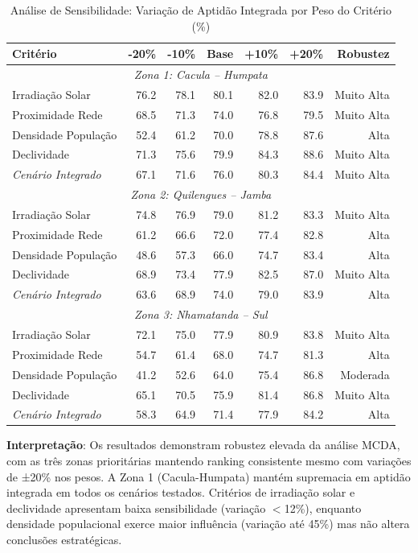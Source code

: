 \documentclass[12pt, a4paper]{article}
\begin{document}
\begin{table}[H]
\centering
\caption{Análise de Sensibilidade: Variação de Aptidão Integrada por Peso do Critério (\%)}
\label{tab:sensitivity}
\begin{tabular}{|l|r|r|r|r|r|r|}
\hline
\textbf{Critério} & \textbf{-20\%} & \textbf{-10\%} & \textbf{Base} & \textbf{+10\%} & \textbf{+20\%} & \textbf{Robustez} \\
\hline
\multicolumn{7}{|c|}{\textit{Zona 1: Cacula -- Humpata}} \\
\hline
Irradiação Solar & 76.2 & 78.1 & 80.1 & 82.0 & 83.9 & Muito Alta \\
Proximidade Rede & 68.5 & 71.3 & 74.0 & 76.8 & 79.5 & Muito Alta \\
Densidade População & 52.4 & 61.2 & 70.0 & 78.8 & 87.6 & Alta \\
Declividade & 71.3 & 75.6 & 79.9 & 84.3 & 88.6 & Muito Alta \\
\textit{Cenário Integrado} & 67.1 & 71.6 & 76.0 & 80.3 & 84.4 & Muito Alta \\
\hline
\multicolumn{7}{|c|}{\textit{Zona 2: Quilengues -- Jamba}} \\
\hline
Irradiação Solar & 74.8 & 76.9 & 79.0 & 81.2 & 83.3 & Muito Alta \\
Proximidade Rede & 61.2 & 66.6 & 72.0 & 77.4 & 82.8 & Alta \\
Densidade População & 48.6 & 57.3 & 66.0 & 74.7 & 83.4 & Alta \\
Declividade & 68.9 & 73.4 & 77.9 & 82.5 & 87.0 & Muito Alta \\
\textit{Cenário Integrado} & 63.6 & 68.9 & 74.0 & 79.0 & 83.9 & Alta \\
\hline
\multicolumn{7}{|c|}{\textit{Zona 3: Nhamatanda -- Sul}} \\
\hline
Irradiação Solar & 72.1 & 75.0 & 77.9 & 80.9 & 83.8 & Muito Alta \\
Proximidade Rede & 54.7 & 61.4 & 68.0 & 74.7 & 81.3 & Alta \\
Densidade População & 41.2 & 52.6 & 64.0 & 75.4 & 86.8 & Moderada \\
Declividade & 65.1 & 70.5 & 75.9 & 81.4 & 86.8 & Muito Alta \\
\textit{Cenário Integrado} & 58.3 & 64.9 & 71.4 & 77.9 & 84.2 & Alta \\
\hline
\end{tabular}
\end{table}

\textbf{Interpretação}: Os resultados demonstram robustez elevada da análise MCDA, com as três zonas prioritárias mantendo ranking consistente mesmo com variações de ±20\% nos pesos. A Zona 1 (Cacula-Humpata) mantém supremacia em aptidão integrada em todos os cenários testados. Critérios de irradiação solar e declividade apresentam baixa sensibilidade (variação $<$12\%), enquanto densidade populacional exerce maior influência (variação até 45\%) mas não altera conclusões estratégicas.
\end{document}
